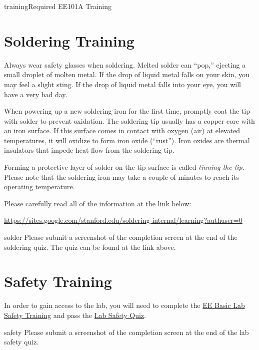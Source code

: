 \begin{mainquestion}{training}{Required EE101A Training}
\section*{Soldering Training}
Always wear safety glasses when soldering. Melted solder can ``pop,'' ejecting a small droplet of molten metal. If the drop of liquid metal falls on your skin, you may feel a slight sting. If the drop of liquid metal falls into your eye, you will have a very bad day.

When powering up a new soldering iron for the first time, promptly coat the tip with solder to prevent oxidation. The soldering tip usually has a copper core with an iron surface. If this surface comes in contact with oxygen (air) at elevated temperatures, it will oxidize to form iron oxide (``rust''). Iron oxides are thermal insulators that impede heat flow from the soldering tip.

Forming a protective layer of solder on the tip surface is called \emph{tinning the tip}. Please note that the soldering iron may take a couple of minutes to reach its operating temperature.

Please carefully read all of the information at the link below:

\begin{center}
\url{https://sites.google.com/stanford.edu/soldering-internal/learning?authuser=0}
\end{center}

\begin{partquestion}{solder}
{Please submit a screenshot of the completion screen at the end of the soldering quiz. The quiz can be found at the link above.}

\begin{answer}
\end{answer}
\end{partquestion}
\section*{Safety Training}
In order to gain access to the lab, you will need to complete the \href{https://drive.google.com/file/d/1UYZG5UO8G1NxXx5_a6gG9zF61goSwH3i/view}{EE Basic Lab Safety Training} and pass the \href{https://docs.google.com/forms/d/e/1FAIpQLSeOOwr2M8SxW7_CySm2XszzfyHqjzxqcVB9zLIyDYSYWiBs8A/viewform}{Lab Safety Quiz}.

\begin{partquestion}{safety}
{Please submit a screenshot of the completion screen at the end of the lab safety quiz.}

\begin{answer}
\end{answer}
\end{partquestion}


\end{mainquestion}